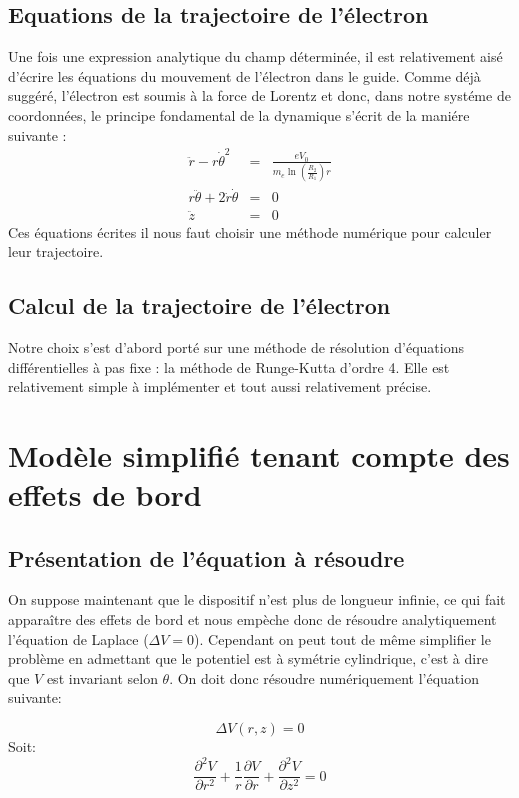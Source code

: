 \documentclass[a4paper,12pt]{article}
\begin{document}
\subsection{Equations de la trajectoire de l'électron}

Une fois une expression analytique du champ déterminée, il est relativement aisé d'écrire les équations du mouvement de l'électron dans le guide. Comme déjà suggéré, l'électron est soumis à la force de Lorentz et donc, dans notre systéme de coordonnées, le principe fondamental de la dynamique s'écrit de la maniére suivante :
\begin{eqnarray}
\ddot{r} - r \dot{\theta}^2 &=& \frac{e V_0}{m_e \ln(\frac{R_2}{R_1}) r} \\
r \ddot{\theta} + 2 \dot{r} \dot{\theta} &=& 0\\
\ddot{z} &=& 0
\end{eqnarray}
Ces équations écrites il nous faut choisir une méthode numérique pour calculer leur trajectoire.

\subsection{Calcul de la trajectoire de l'électron}

Notre choix s'est d'abord porté sur une méthode de résolution d'équations différentielles à pas fixe : la méthode de Runge-Kutta d'ordre 4. Elle est relativement simple à implémenter et tout aussi relativement précise.


\section{Modèle simplifié tenant compte des effets de bord}

\subsection{Présentation de l'équation à résoudre}
On suppose maintenant que le dispositif n'est plus de longueur infinie, ce qui fait apparaître des effets de bord et nous empèche donc de résoudre analytiquement l'équation de Laplace ($\Delta V=0$). Cependant on peut tout de même simplifier le problème en admettant que le potentiel est à symétrie cylindrique, c'est à dire que $V$ est invariant selon $\theta$. On doit donc résoudre numériquement l'équation suivante:

\[
\Delta V(r,z)=0
\]
Soit:
\[
\frac{\partial^2 V}{\partial r^2}+\frac{1}{r}\frac{\partial V}{ \partial r}+\frac{\partial^2 V}{\partial z^2}=0
\]
\end{document}
